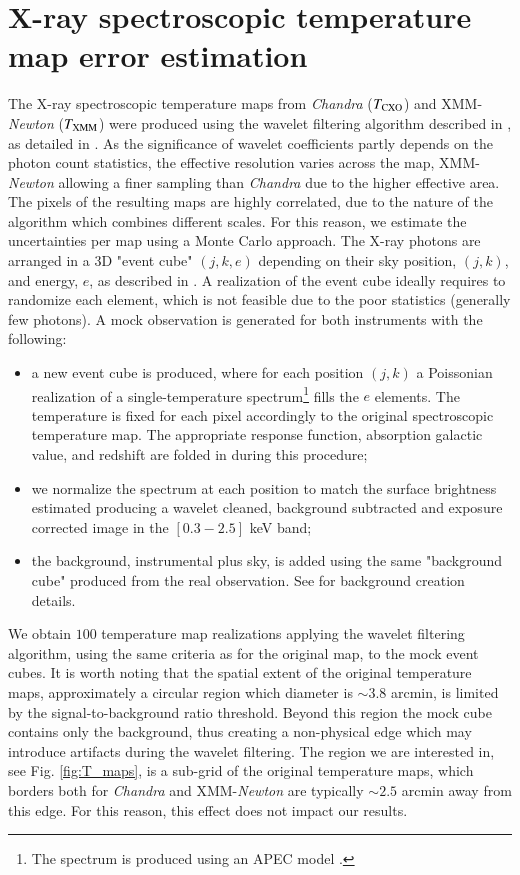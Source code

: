 \documentclass[twocolumn,traditabstract]{aa}
\newcommand{\ccor}[1]{\textcolor{Mypink}{#1}}
\def \TXC {T_{\rm CXO}}
\def \TXX {T_{\rm XMM}}
\begin{document}
\section{X-ray spectroscopic temperature map error estimation}\label{append:Txerror}
\ccor{The X-ray spectroscopic temperature maps from \textit{Chandra} ($\TXC$) and XMM-\textit{Newton} ($\TXX$) were produced using the wavelet filtering algorithm described in \cite{Bourdin2008}, as detailed in \cite{Adam2016b}. As the significance of wavelet coefficients partly depends on the photon count statistics, the effective resolution varies across the map, XMM-\textit{Newton} allowing a finer sampling than \textit{Chandra} due to the higher effective area. The pixels of the resulting maps are highly correlated, due to the nature of the algorithm which combines different scales. For this reason, we estimate the uncertainties per map using a Monte Carlo approach. The X-ray photons are arranged in a 3D "event cube" $(j,k,e)$ depending on their sky position, $(j,k)$, and energy, $e$, as described in \cite{Adam2016b}. A realization of the event cube ideally requires to randomize each element, which is not feasible due to the poor statistics (generally few photons). 
 A mock observation is generated for both instruments with the following:
\begin{itemize}
\item a new event cube is produced, where for each position $(j,k)$ a Poissonian realization of a single-temperature spectrum\footnote{The spectrum is produced using an APEC model \citep{smith2001}. } fills the $e$ elements. 
         The temperature is fixed for each pixel accordingly to the original spectroscopic temperature map. The appropriate response function, absorption galactic value, and redshift are folded in during this procedure;
\item we normalize the spectrum at each position to match the surface brightness estimated producing a wavelet cleaned, background subtracted and exposure corrected image in the $[0.3-2.5]$ keV band;
\item the background, instrumental plus sky, is added using the same "background cube" produced from the real observation. See \cite{Adam2016b} for background creation details.     
\end{itemize}
We obtain $100$ temperature map realizations applying the wavelet filtering algorithm, using the same criteria as for the original map, to the mock event cubes. 
It is worth noting that the spatial extent of the original temperature maps, approximately a circular region which diameter is $\sim 3.8$ arcmin, is limited by the signal-to-background ratio threshold. Beyond this region the mock cube contains only the background, thus creating a non-physical edge which may introduce artifacts during the wavelet filtering. 
The region we are interested in, see Fig. \ref{fig:T_maps},  is a sub-grid of the original temperature maps, which borders both for \textit{Chandra} and XMM-\textit{Newton} are typically $\sim 2.5$ arcmin away from this edge. For this reason, this effect does not impact our results.}
\end{document}
